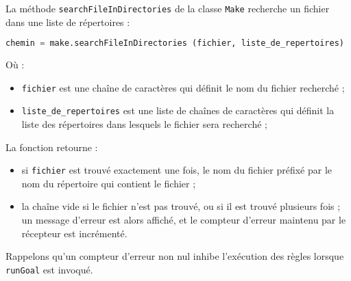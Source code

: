 \documentclass[a4paper,12pt,obeyspaces,openany]{extarticle}
\begin{document}
La méthode \texttt{searchFileInDirectories} de la classe \texttt{Make} recherche un fichier dans une liste de répertoires :
\begin{lstlisting}[language=py]
chemin = make.searchFileInDirectories (fichier, liste_de_repertoires)
\end{lstlisting}
Où :
\begin{itemize}
  \item \texttt{fichier} est une chaîne de caractères qui définit le nom du fichier recherché ;
  \item \texttt{liste\_de\_repertoires} est une liste de chaînes de caractères qui définit la liste des répertoires dans lesquels le fichier sera recherché ;
\end{itemize}
La fonction retourne :
\begin{itemize}
  \item si \texttt{fichier} est trouvé exactement une fois, le nom du fichier préfixé par le nom du répertoire qui contient le fichier ;
  \item la chaîne vide si le fichier n'est pas trouvé, ou si il est trouvé plusieurs fois ; un message d'erreur est alors affiché, et le compteur d'erreur maintenu par le récepteur est incrémenté.
\end{itemize}

Rappelons qu'un compteur d'erreur non nul inhibe l'exécution des règles lorsque \texttt{runGoal} est invoqué.


\end{document}
